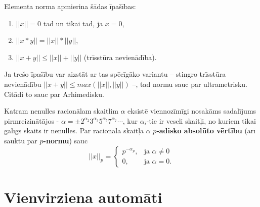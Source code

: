 \documentclass{ludis}
\begin{document}
Elementa norma apmierina šādas īpašības:
\begin{enumerate}
\item $||x||=0$ tad un tikai tad, ja $x=0$,
\item $||x*y|| = ||x||*||y||$,
\item $||x+y|| \leq ||x||+||y||$ (trīsstūra nevienādība).
\end{enumerate}
Ja trešo īpašību var aizstāt ar tas spēcīgāko variantu -- stingro trīsstūra nevienādību $||x+y|| \leq max(||x||,||y||)$ --, tad normu sauc par ultrametrisku. Citādi to sauc par Arhimedisku. %

\begin{definicija}
Katram nenulles racionālam skaitlim $\alpha$ eksistē viennozīmīgi nosakāms sadalījums pirmreizinātājos - $\alpha = \pm 2^{\alpha_2}3^{\alpha_3}5^{\alpha_5}7^{\alpha_7} \cdots$, kur $\alpha_i$-tie ir veseli skaitļi, no kuriem tikai galīgs skaits ir nenulles. Par racionāla skaitļa $\alpha$ \textbf{$p$-adisko absolūto vērtību} (arī sauktu par \textbf{$p$-normu}) sauc 
\[
||x||_p = \begin{cases}
p^{-\alpha_p}, &\textrm{ja } \alpha \neq 0 \\
0, &\textrm{ja } \alpha = 0.
\end{cases}
\]
\end{definicija}

\chapter{Vienvirziena automāti}
\end{document}
